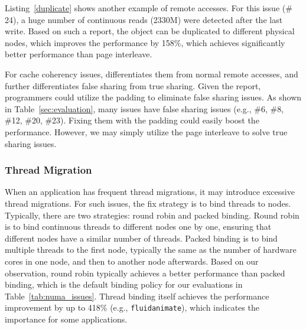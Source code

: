Listing~\ref{duplicate} shows another example of remote accesses. For this issue (\# 24), a huge number of continuous reads (2330M) were detected after the last write. Based on such a report, the object can be duplicated to different physical nodes, which improves the performance by 158\%, which achieves significantly better performance than page interleave. 

For cache coherency issues,  \NP{} differentiates them from normal remote accesses, and further differentiates false sharing from true sharing. Given the report, programmers could utilize the padding to eliminate false sharing issues. As shown in Table~\ref{sec:evaluation}, many issues have false sharing issues (e.g., \#6, \#8, \#12, \#20, \#23). Fixing them with the padding could easily boost the performance. However, we may simply utilize the page interleave to solve true sharing issues. 


\subsubsection{Thread Migration} 
When an application has frequent thread migrations, it may introduce excessive thread migrations. For such issues, the fix strategy is to bind threads to nodes. Typically, there are two strategies: round robin and packed binding. Round robin is to bind continuous threads to different nodes one by one,  ensuring that different nodes have a similar number of threads. Packed binding is to bind multiple threads to the first node, typically the same as the number of hardware cores in one node, and then to another node afterwards. Based on our observation, round robin typically achieves a better performance than packed binding, which is the default binding policy for our evaluations in Table~\ref{tab:numa_issues}. Thread binding itself achieves the performance improvement by up to 418\% (e.g., \texttt{fluidanimate}), which indicates the importance for some applications. 

